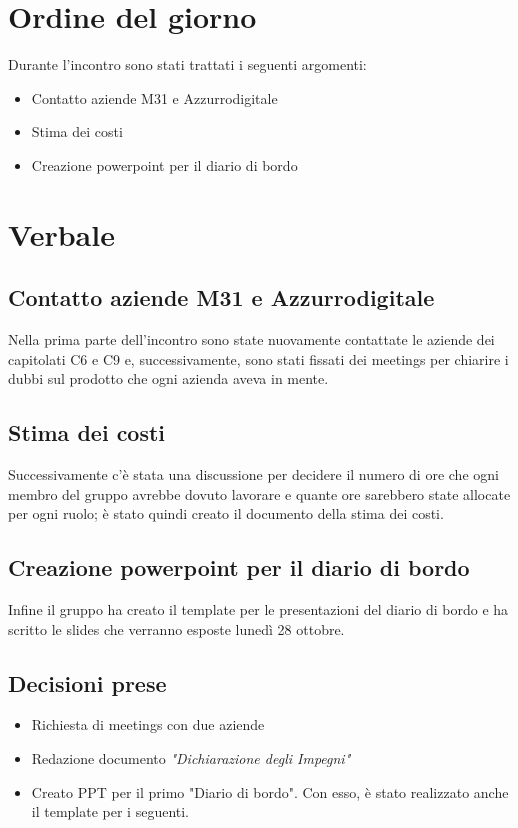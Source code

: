 \documentclass[italian, 12pt]{article}
\begin{document}
\section{Ordine del giorno}
Durante l'incontro sono stati trattati i seguenti argomenti: 
\begin{flushleft}
        \begin{itemize}
            \item Contatto aziende M31 e Azzurrodigitale
            \item Stima dei costi 
            \item Creazione powerpoint per il diario di bordo
        \end{itemize}
\end{flushleft}
\newpage

\section{Verbale}
\subsection{Contatto aziende M31 e Azzurrodigitale}
Nella prima parte dell'incontro sono state nuovamente contattate le aziende dei capitolati C6 e C9 e, successivamente, sono stati fissati dei meetings per chiarire i dubbi sul prodotto che ogni azienda aveva in mente.

\subsection{Stima dei costi}
Successivamente c'è stata una discussione per decidere il numero di ore che ogni membro del gruppo avrebbe dovuto lavorare e quante ore sarebbero state allocate per ogni ruolo; è stato quindi creato il documento della stima dei costi.

\subsection{Creazione powerpoint per il diario di bordo}
Infine il gruppo ha creato il template per le presentazioni del diario di bordo e ha scritto le slides che verranno esposte lunedì 28 ottobre.

\subsection{Decisioni prese}
\begin{itemize}
    \item Richiesta di meetings con due aziende
    \item Redazione documento \textit{"Dichiarazione degli Impegni"}
    \item Creato PPT per il primo "Diario di bordo". Con esso, è stato realizzato anche il template per i seguenti.
\end{itemize}
\end{document}
